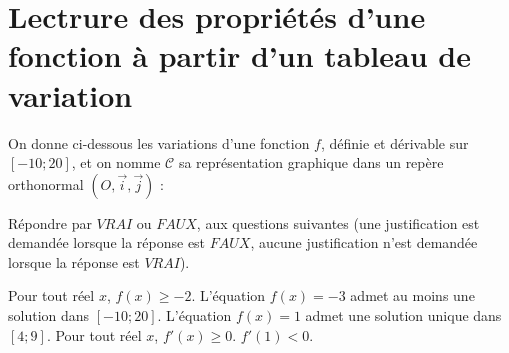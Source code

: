 \section{Lectrure des propriétés d'une fonction à partir d'un tableau de variation}

On donne ci-dessous les variations d'une fonction $f$, définie et dérivable sur $[-10;20]$, et on nomme $\mathcal{C}$ sa représentation graphique dans un repère orthonormal $(O, \vec{i}, \vec{j})$ :

Répondre par $VRAI$ ou $FAUX$, aux questions suivantes (une justification est demandée lorsque la réponse est $FAUX$, aucune justification n'est demandée lorsque la réponse est $VRAI$).



\begin{questions}
	\question[1]  Pour tout réel $x$, $f(x) \ge -2$.
	\question[1]  L'équation $f(x)=-3$ admet au moins une solution dans $[-10;20]$.
	\question[1] L'équation $f(x)=1$ admet une solution unique dans $[4;9]$.
	\question[1] Pour tout réel $x$, $f'(x)\ge 0$.
	\question[1] $f'(1)<0$.
\end{questions}